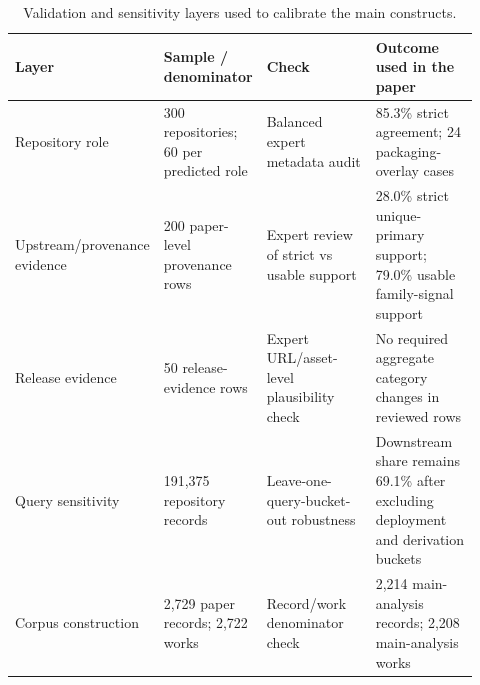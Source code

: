 \begin{table}[t]
\centering
\caption{Validation and sensitivity layers used to calibrate the main constructs.}
\label{tab:validation-layers}
\small
\begin{tabular}{p{0.18\linewidth}p{0.22\linewidth}p{0.27\linewidth}p{0.25\linewidth}}
\toprule
Layer & Sample / denominator & Check & Outcome used in the paper \\
\midrule
Repository role & 300 repositories; 60 per predicted role & Balanced expert metadata audit & 85.3\% strict agreement; 24 packaging-overlay cases \\
Upstream/provenance evidence & 200 paper-level provenance rows & Expert review of strict vs usable support & 28.0\% strict unique-primary support; 79.0\% usable family-signal support \\
Release evidence & 50 release-evidence rows & Expert URL/asset-level plausibility check & No required aggregate category changes in reviewed rows \\
Query sensitivity & 191,375 repository records & Leave-one-query-bucket-out robustness & Downstream share remains 69.1\% after excluding deployment and derivation buckets \\
Corpus construction & 2,729 paper records; 2,722 works & Record/work denominator check & 2,214 main-analysis records; 2,208 main-analysis works \\
\bottomrule
\end{tabular}
\end{table}
